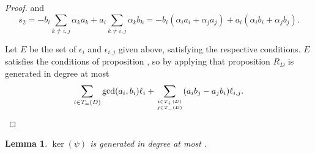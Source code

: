 \documentclass{amsart}
\theoremstyle{plain}
\newtheorem{lem}[thm]{Lemma}
\theoremstyle{definition}
\theoremstyle{remark}
\numberwithin{equation}{section}
\newcommand\bida{a}
\newcommand\bidb{b}
\begin{document}
\begin{proof}
\noindent
and
\[
	s_2 = -\bidb_i \sum_{k \ne i,j} \alpha_k \bida_k + \bida_i \sum_{k \ne i, j}
	\alpha_k \bidb_k = -b_i (\alpha_i a_i + \alpha_j a_j) + a_i (\alpha_i b_i + \alpha_j b_j).
\]

Let $E$ be the set of $\epsilon_i$ and $\epsilon_{i,j}$ given 
above, satisfying the respective conditions.
$E$ satisfies the conditions of proposition , so by applying that proposition $R_D$ is generated in 
degree at most
\[
	\sum_{i\in T_=(D)} \gcd(\bida_i, \bidb_i)\ell_i + \sum_{i\in T_+(D) \atop
	j \in T_-(D)} (\bida_i \bidb_j- \bida_j \bidb_i)\ell_{i,j}.
\]
\end{proof}

\begin{lem}
$\ker(\psi)$ is generated in degree at most .
\end{lem}
\end{document}

